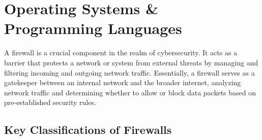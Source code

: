 \section{Operating Systems \& Programming Languages}
A firewall is a crucial component in the realm of cybersecurity. It acts as a barrier that protects a network or system from external threats by managing and filtering incoming and outgoing network traffic. Essentially, a firewall serves as a gatekeeper between an internal network and the broader internet, analyzing network traffic and determining whether to allow or block data packets based on pre-established security rules.



\subsection{Key Classifications of Firewalls}

